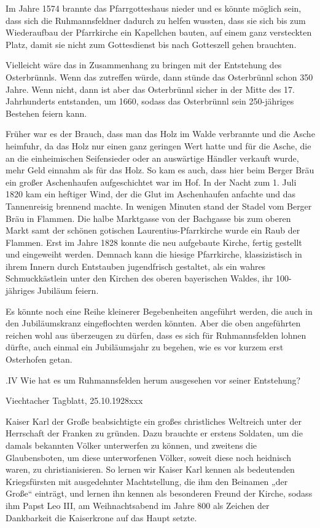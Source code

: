 \documentclass[12pt,a4paper]{book}
\begin{document}
Im Jahre 1574 brannte das Pfarrgotteshaus nieder und es könnte möglich sein,
dass sich die Ruhmannsfeldner dadurch zu helfen wussten, dass sie sich bis zum
Wiederaufbau der Pfarrkirche ein Kapellchen bauten, auf einem ganz versteckten
Platz, damit sie nicht zum Gottesdienst bis nach Gotteszell gehen brauchten.

Vielleicht wäre das in Zusammenhang zu bringen mit der Entstehung des
Osterbrünnls. Wenn das zutreffen würde, dann stünde das Osterbrünnl schon 350
Jahre. Wenn nicht, dann ist aber das Osterbrünnl sicher in der Mitte des 17.
Jahrhunderts entstanden, um 1660, sodass das Osterbrünnl sein 250-jähriges
Bestehen feiern kann.

Früher war es der Brauch, dass man das Holz im Walde verbrannte und die Asche
heimfuhr, da das Holz nur einen ganz geringen Wert hatte und für die Asche, die
an die einheimischen Seifensieder oder an auswärtige Händler verkauft wurde,
mehr Geld einnahm als für das Holz. So kam es auch, dass hier beim Berger Bräu
ein großer Aschenhaufen aufgeschichtet war im Hof. In der Nacht zum 1. Juli 1820
kam ein heftiger Wind, der die Glut im Aschenhaufen anfachte und das
Tannenreisig brennend machte. In wenigen Minuten stand der Stadel vom Berger
Bräu in Flammen. Die halbe Marktgasse von der Bachgasse bis zum oberen Markt
samt der schönen gotischen Laurentius-Pfarrkirche wurde ein Raub der Flammen.
Erst im Jahre 1828 konnte die neu aufgebaute Kirche, fertig gestellt und
eingeweiht werden. Demnach kann die hiesige Pfarrkirche, klassizistisch in ihrem
Innern durch Entstauben jugendfrisch gestaltet, als ein wahres Schmuckkästlein
unter den Kirchen des oberen bayerischen Waldes, ihr 100-jähriges Jubiläum
feiern.

Es könnte noch eine Reihe kleinerer Begebenheiten angeführt werden, die auch in
den Jubiläumskranz eingeflochten werden könnten. Aber die oben angeführten
reichen wohl aus überzeugen zu dürfen, dass es sich für Ruhmannsfelden lohnen
dürfte, auch einmal ein Jubiläumsjahr zu begehen, wie es vor kurzem erst
Osterhofen getan.

.IV Wie hat es um Ruhmannsfelden herum ausgesehen vor seiner Entstehung?

Viechtacher Tagblatt, 25.10.1928xxx

Kaiser Karl der Große beabsichtigte ein großes christliches Weltreich unter der
Herrschaft der Franken zu gründen. Dazu brauchte er erstens Soldaten, um die
damals bekannten Völker unterwerfen zu können, und zweitens die Glaubensboten,
um diese unterworfenen Völker, soweit diese noch heidnisch waren, zu
christianisieren. So lernen wir Kaiser Karl kennen als bedeutenden Kriegsfürsten
mit ausgedehnter Machtstellung, die ihm den Beinamen „der Große“ einträgt, und
lernen ihn kennen als besonderen Freund der Kirche, sodass ihm Papst Leo III, am
Weihnachtsabend im Jahre 800 als Zeichen der Dankbarkeit die Kaiserkrone auf das
Haupt setzte.
\end{document}
